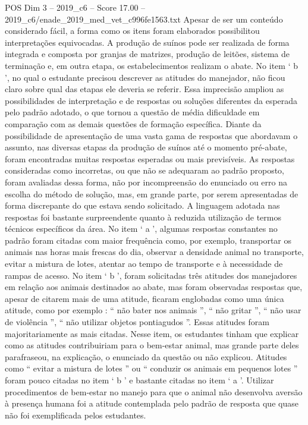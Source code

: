 \begin{textsample}{POS Dim 3 – 2019\_c6 – Score 17.00 – 2019\_c6/enade\_2019\_med\_vet\_c996fe1563.txt}
Apesar de ser um conteúdo considerado fácil, a forma como os itens foram elaborados possibilitou interpretações equivocadas.
A produção de suínos pode ser realizada de forma integrada e composta por granjas de matrizes, produção de leitões, sistema de terminação e, em outra etapa, os estabelecimentos realizam o abate.
No item ‘ b ’, no qual o estudante precisou descrever as atitudes do manejador, não ficou claro sobre qual das etapas ele deveria se referir.
Essa imprecisão ampliou as possibilidades de interpretação e de respostas ou soluções diferentes da esperada pelo padrão adotado, o que tornou a questão de média dificuldade em comparação com as demais questões de formação específica.
Diante da possibilidade de apresentação de uma vasta gama de respostas que abordavam o assunto, nas diversas etapas da produção de suínos até o momento pré-abate, foram encontradas muitas respostas esperadas ou mais previsíveis.
As respostas consideradas como incorretas, ou que não se adequaram ao padrão proposto, foram avaliadas dessa forma, não por incompreensão do enunciado ou erro na escolha do método de solução, mas, em grande parte, por serem apresentadas de forma discrepante do que estava sendo solicitado.
A linguagem adotada nas respostas foi bastante surpreendente quanto à reduzida utilização de termos técnicos específicos da área.
No item ‘ a ’, algumas respostas constantes no padrão foram citadas com maior frequência como, por exemplo, transportar os animais nas horas mais frescas do dia, observar a densidade animal no transporte, evitar a mistura de lotes, atentar ao tempo de transporte e à necessidade de rampas de acesso.
No item ‘ b ’, foram solicitadas três atitudes dos manejadores em relação aos animais destinados ao abate, mas foram observadas respostas que, apesar de citarem mais de uma atitude, ficaram englobadas como uma única atitude, como por exemplo : “ não bater nos animais ”, “ não gritar ”, “ não usar de violência ”, “ não utilizar objetos pontiagudos ”.
Essas atitudes foram majoritariamente as mais citadas.
Nesse item, os estudantes tinham que explicar como as atitudes contribuiriam para o bem-estar animal, mas grande parte deles parafraseou, na explicação, o enunciado da questão ou não explicou.
Atitudes como “ evitar a mistura de lotes ” ou “ conduzir os animais em pequenos lotes ” foram pouco citadas no item ‘ b ’ e bastante citadas no item ‘ a ’.
Utilizar procedimentos de bem-estar no manejo para que o animal não desenvolva aversão à presença humana foi a atitude contemplada pelo padrão de resposta que quase não foi exemplificada pelos estudantes.

\end{textsample}
